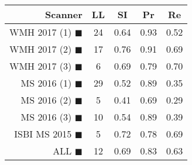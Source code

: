 \begin{tabular}{rcccc}
\toprule
Scanner & LL & SI & Pr & Re \\
\midrule
WMH 2017 (1) {\color[rgb]{ 1.00 0.00 0.00}$\blacksquare$} & 24 & 0.64 & 0.93 & 0.52 \\
WMH 2017 (2) {\color[rgb]{ 1.00 0.50 0.00}$\blacksquare$} & 17 & 0.76 & 0.91 & 0.69 \\
WMH 2017 (3) {\color[rgb]{ 1.00 0.80 0.00}$\blacksquare$} & 6 & 0.69 & 0.79 & 0.70 \\
MS  2016 (1) {\color[rgb]{ 0.20 0.80 0.00}$\blacksquare$} & 29 & 0.52 & 0.89 & 0.35 \\
MS  2016 (2) {\color[rgb]{ 0.00 0.40 1.00}$\blacksquare$} & 5 & 0.41 & 0.69 & 0.29 \\
MS  2016 (3) {\color[rgb]{ 0.60 0.00 1.00}$\blacksquare$} & 10 & 0.54 & 0.89 & 0.39 \\
ISBI MS 2015 {\color[rgb]{ 1.00 0.00 1.00}$\blacksquare$} & 5 & 0.72 & 0.78 & 0.69 \\
\midrule
ALL {\color[rgb]{ 1.00 1.00 1.00}$\blacksquare$} & 12 & 0.69 & 0.83 & 0.63 \\
\bottomrule
\end{tabular}